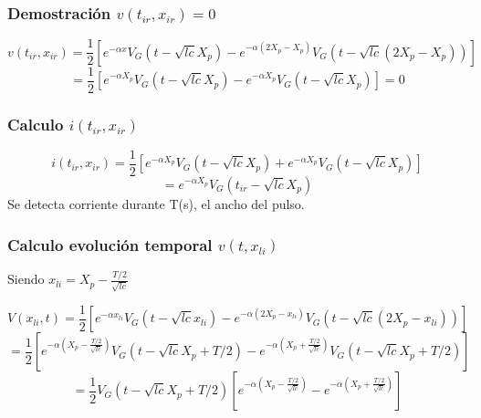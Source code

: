 \documentclass[12pt]{article}
\begin{document}
\subsubsection{Demostración $v({t}_{ir},{x}_{ir})=0$}
\begin{displaymath}
v({t}_{ir},{x}_{ir})= \frac{1}{2}[{e}^{-\alpha x}{V}_{G}(t-\sqrt{lc}{X}_{p}) - {e}^{-\alpha(2{X}_{p}-{X}_{p})} {V}_{G}(t-\sqrt{lc}(2{X}_{p}-{X}_{p}))]
\end{displaymath}
\begin{displaymath}
= \frac{1}{2}[{e}^{-\alpha {X}_{p}}{V}_{G}(t-\sqrt{lc}{X}_{p}) - {e}^{-\alpha{X}_{p}} {V}_{G}(t-\sqrt{lc}{X}_{p})]=0
\end{displaymath}

\subsubsection{Calculo $i({t}_{ir},{x}_{ir})$}
\begin{displaymath}
i({t}_{ir},{x}_{ir})= \frac{1}{2}[{e}^{-\alpha {X}_{p}}{V}_{G}(t-\sqrt{lc}{X}_{p}) + {e}^{-\alpha{X}_{p}} {V}_{G}(t-\sqrt{lc}{X}_{p})]
\end{displaymath}
\begin{displaymath}
= {e}^{-\alpha {X}_{p}}{V}_{G}({t}_{ir}-\sqrt{lc}{X}_{p})
\end{displaymath}
Se detecta corriente durante T(s), el ancho del pulso.
\subsubsection{Calculo evolución temporal $v(t,{x}_{li})$}
Siendo ${x}_{li} = {X}_{p}- \frac{T/2}{\sqrt{lc}}$

\begin{displaymath}
V({x}_{li},t)= \frac{1}{2}[{e}^{-\alpha {x}_{li}}{V}_{G}(t-\sqrt{lc}{x}_{li}) - {e}^{-\alpha(2{X}_{p}-{x}_{li})} {V}_{G}(t-\sqrt{lc}(2{X}_{p}-{x}_{li}))]
\end{displaymath}
\begin{displaymath}
= \frac{1}{2}[{e}^{-\alpha ({X}_{p}- \frac{T/2}{\sqrt{lc}})}{V}_{G}(t-\sqrt{lc}{X}_{p} + {T/2}) - {e}^{-\alpha({X}_{p} + \frac{T/2}{\sqrt{lc}})} {V}_{G}(t-\sqrt{lc}{X}_{p} + {T/2})]
\end{displaymath}
\begin{displaymath}
= \frac{1}{2}{V}_{G}(t-\sqrt{lc}{X}_{p} + {T/2})[{e}^{-\alpha ({X}_{p}- \frac{T/2}{\sqrt{lc}})} - {e}^{-\alpha({X}_{p} + \frac{T/2}{\sqrt{lc}})}]
\end{displaymath}
\end{document}
